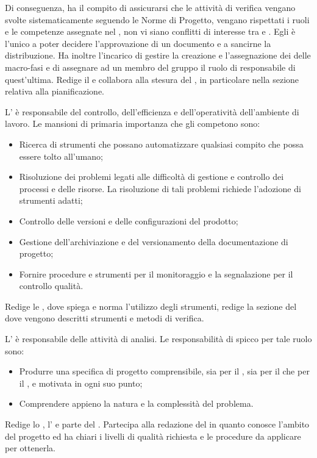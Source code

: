 \documentclass[12pt,a4paper]{article}
\begin{document}
Di conseguenza, ha il compito di assicurarsi che le attività di verifica vengano svolte sistematicamente seguendo le Norme di Progetto, vengano rispettati i ruoli e le competenze assegnate nel \PdP{}, non vi siano conflitti di interesse tra \textit{} e
\textit{}. Egli è l’unico a poter decidere l’approvazione di un documento e a sancirne la distribuzione.
Ha inoltre l’incarico di gestire la creazione e l’assegnazione dei \textit{} delle macro-fasi e di assegnare ad un membro del gruppo il ruolo di responsabile di quest’ultima.
Redige il \PdP{} e collabora alla stesura del \PdQ{}, in particolare nella sezione relativa alla pianificazione.

L’\AM{} è responsabile del controllo, dell’efficienza e dell’operatività dell’ambiente di lavoro. Le mansioni di primaria importanza che gli competono sono:
\begin{itemize}
  \item Ricerca di strumenti che possano automatizzare qualsiasi compito che possa essere tolto all’umano;
  \item Risoluzione dei problemi legati alle difficoltà di gestione e controllo dei processi e delle risorse. La risoluzione di tali problemi richiede l’adozione di strumenti adatti;
  \item Controllo delle versioni e delle configurazioni del prodotto;
  \item Gestione dell’archiviazione e del versionamento della documentazione di progetto;
  \item Fornire procedure e strumenti per il monitoraggio e la segnalazione per il controllo qualità.
\end{itemize}
Redige le \NdP{}, dove spiega e norma l’utilizzo degli strumenti, redige la sezione del \PdQ{} dove vengono descritti strumenti e metodi di verifica.

L’\AN{} è responsabile delle attività di analisi. Le responsabilità di spicco per tale ruolo sono:
\begin{itemize}
  \item Produrre una specifica di progetto comprensibile, sia per il , sia per il \textit{} che per il \PG{}, e motivata in ogni suo punto;
  \item Comprendere appieno la natura e la complessità del problema.
\end{itemize}
Redige lo \SdF{}, l’\AdR{} e parte del \PdQ{}.
Partecipa alla redazione del \PdQ{} in quanto conosce l’ambito del progetto ed ha chiari i livelli di qualità richiesta e le procedure da applicare per ottenerla.
\end{document}
